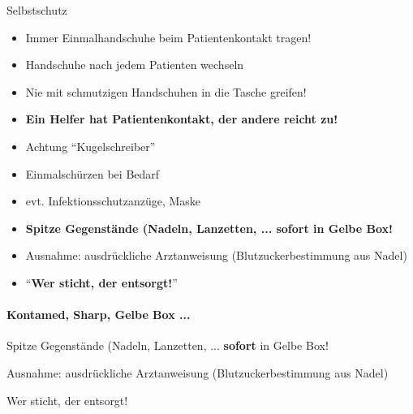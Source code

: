 \documentclass{article}
\newcommand\gEs[1]{\textbf{\textcolor[rgb]{0.0,0.0,0.5019608}{#1}}}
\newcommand\gEs[1]{\textbf{\textcolor[rgb]{0.0,0.0,0.5019608}{#1}}}
\begin{document}
{\mdseries\color[rgb]{0.0,0.0,0.5019608}
Selbstschutz}

\begin{itemize}
\item {\mdseries
Immer Einmalhandschuhe beim Patientenkontakt tragen!}

\item {\mdseries
Handschuhe nach jedem Patienten wechseln}

\item {\mdseries
Nie mit schmutzigen Handschuhen in die Tasche greifen!}

\item {\mdseries
\gEs{Ein Helfer hat Patientenkontakt, der andere
reicht zu!}}

\item {\mdseries
Achtung {\textquotedblleft}Kugelschreiber{\textquotedblright}}

\item {\mdseries
Einmalsch\"urzen bei Bedarf}

\end{itemize}
\begin{itemize}
\item {\mdseries
evt. Infektionsschutzanz\"uge, Maske}

\end{itemize}
\begin{itemize}
\item {\mdseries
\gEs{Spitze Gegenst\"ande (Nadeln, Lanzetten, ...
}\gEs{sofort}\gEs{ in Gelbe
Box!}}

\end{itemize}
\begin{itemize}
\item {\mdseries
Ausnahme: ausdr\"uckliche Arztanweisung (Blutzuckerbestimmung aus
Nadel)}

\item {\mdseries
{\textquotedblleft}\gEs{Wer sticht, der
entsorgt!}{\textquotedblright}}

\end{itemize}
\paragraph{Kontamed, Sharp, Gelbe Box ...}
{\mdseries
Spitze Gegenst\"ande (Nadeln, Lanzetten, ...
\gEs{sofort} in Gelbe Box!}

{\mdseries
Ausnahme: ausdr\"uckliche Arztanweisung (Blutzuckerbestimmung aus
Nadel)}

{\mdseries
Wer sticht, der entsorgt!}
\end{document}
